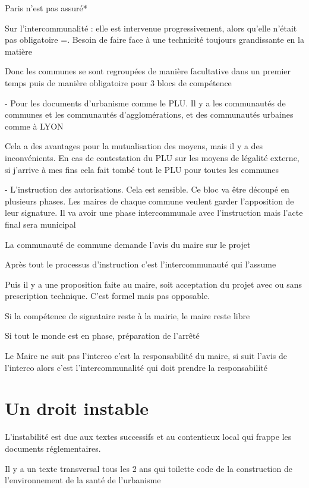 		Paris n’est pas assuré*


		Sur l’intercommunalité : elle est intervenue progressivement, alors qu’elle n’était pas obligatoire =. Besoin de faire face à une technicité toujours grandissante en la matière

		Donc les communes se sont regroupées de manière facultative dans un premier temps puis de manière obligatoire pour 3 blocs de compétence

		-	Pour les documents d’urbanisme comme le PLU. Il y a les communautés de communes et les communautés d’agglomérations, et des communautés urbaines comme à LYON

		Cela a des avantages pour la mutualisation des moyens, mais il y a des inconvénients. En cas de contestation du PLU sur les moyens de légalité externe, si j’arrive à mes fins cela fait tombé tout le PLU pour toutes les communes


		-	L’instruction des autorisations. Cela est sensible. Ce bloc va être découpé en plusieurs phases. Les maires de chaque commune veulent garder l’apposition de leur signature. Il va avoir une phase intercommunale avec l’instruction mais l’acte final sera municipal

		La communauté de commune demande l’avis du maire sur le projet

		Après tout le processus d’instruction c’est l’intercommunauté qui l’assume

		Puis il y a une proposition faite au maire, soit acceptation du projet avec ou sans prescription technique. C’est formel mais pas opposable.

		Si la compétence de signataire reste à la mairie, le maire reste libre

		Si tout le monde est en phase, préparation de l’arrêté

		Le Maire  ne suit pas l’interco c’est la responsabilité du maire, si suit l’avis de l’interco alors c’est l’intercommunalité qui doit prendre la responsabilité



	\section{Un droit instable}

		L'instabilité est due aux textes successifs et au contentieux local qui frappe les documents réglementaires.

		Il y a un texte transversal tous les 2 ans qui toilette code de la construction de l’environnement de la santé de l’urbanisme

